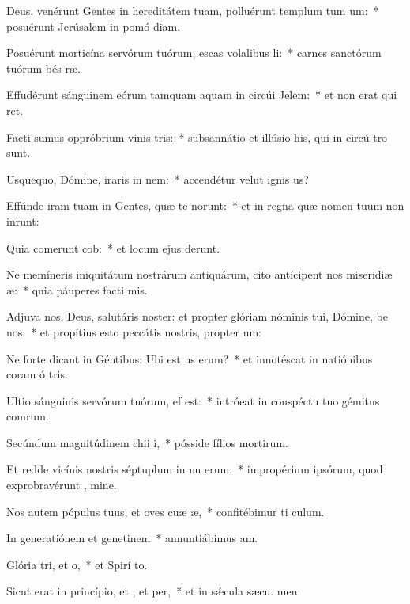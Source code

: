 \item Deus, venérunt Gentes in hereditátem tuam, polluérunt templum tum um:~* posuérunt Jerúsalem in pomó diam.
\item Posuérunt morticína servórum tuórum, escas volalibus li:~* carnes sanctórum tuórum bés ræ.
\item Effudérunt sánguinem eórum tamquam aquam in circúi Jelem:~* et non erat qui ret.
\item Facti sumus oppróbrium vinis tris:~* subsannátio et illúsio his, qui in circú tro sunt.
\item Usquequo, Dómine, iraris in nem:~* accendétur velut ignis  us?
\item Effúnde iram tuam in Gentes, quæ te  norunt:~* et in regna quæ nomen tuum non inrunt:
\item Quia comerunt cob:~* et locum ejus derunt.
\item Ne memíneris iniquitátum nostrárum antiquárum, cito antícipent nos miseridiæ æ:~* quia páuperes facti  mis.
\item Adjuva nos, Deus, salutáris noster: et propter glóriam nóminis tui, Dómine, be nos:~* et propítius esto peccátis nostris, propter  um:
\item Ne forte dicant in Géntibus: Ubi est us erum?~* et innotéscat in natiónibus coram ó tris.
\item Ultio sánguinis servórum tuórum,  ef est:~* intróeat in conspéctu tuo gémitus comrum.
\item Secúndum magnitúdinem chii i,~* pósside fílios mortirum.
\item Et redde vicínis nostris séptuplum in nu erum:~* impropérium ipsórum, quod exprobravérunt , mine.
\item Nos autem pópulus tuus, et oves cuæ æ,~* confitébimur ti  culum.
\item In generatiónem et genetinem~* annuntiábimus  am.
\item Glória tri, et o,~* et Spirí to.
\item Sicut erat in princípio, et , et per,~* et in sǽcula sæcu. men.

